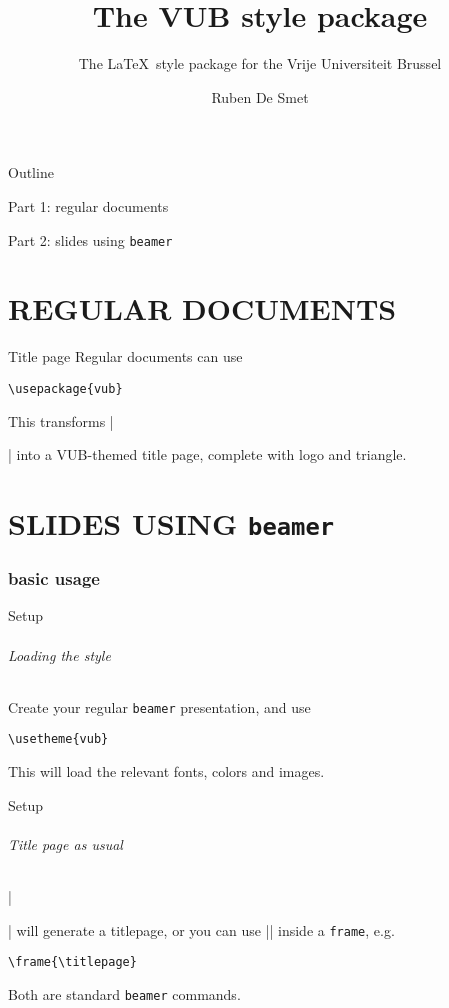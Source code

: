\documentclass{beamer}
\title{The VUB style package}
\subtitle{The \LaTeX\ style package for the Vrije Universiteit Brussel}
\author{Ruben De Smet}
\begin{document}
\frame{\titlepage}

\begin{frame}{Outline}

  {\color{vubbleu}\large Part 1: regular documents}
  \tableofcontents[part=1]

  {\color{vubbleu}\large Part 2: slides using \texttt{beamer}}
  \tableofcontents[part=2]
\end{frame}

\part{REGULAR DOCUMENTS}

\begin{frame}[fragile]{Title page}
Regular documents can use

\begin{verbatim}
\usepackage{vub}
\end{verbatim}

This transforms |\maketitle| into a VUB-themed title page,
complete with logo and triangle.
\end{frame}

\part{SLIDES USING \texttt{beamer}}
\section{basic usage}

\begin{frame}[fragile]{Setup}
\framesubtitle{Loading the style}
Create your regular \texttt{beamer} presentation, and use

\begin{verbatim}
\usetheme{vub}
\end{verbatim}

This will load the relevant fonts, colors and images.
\end{frame}

\begin{frame}[fragile]{Setup}
\framesubtitle{Title page as usual}
|\maketitle| will generate a titlepage,
or you can use |\titlepage| inside a \texttt{frame}, e.g.

\begin{verbatim}
\frame{\titlepage}
\end{verbatim}

Both are standard \texttt{beamer} commands.
\end{frame}
\end{document}
